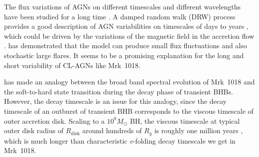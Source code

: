 \documentclass[twocolumn]{aastex63}
\begin{document}
The flux variations of AGNs on different timescales and different wavelengths have been studied for a long time \citep[see reviews in ][]{1997ARA&A..35..445U}. A damped random walk (DRW) process provides a good description of AGN variabilities on timescales of days to years \citep[e.g.][]{2010ApJ...721.1014M,2011ApJ...730...52K}, which could be driven by the variations of the magnetic field in the accretion flow \citep{2004MNRAS.348..111K,2006MNRAS.368..379M,2007A&A...466..793J}. \citet{2004MNRAS.348..111K} has demonstrated that the model can produce small flux fluctuations and also stochastic large flares. It seems to be a promising explanation for the long and short variability of CL-AGNs like Mrk~1018. 

\citet{2018MNRAS.480.3898N} has made an analogy between the broad band spectral evolution of Mrk~1018 and the soft-to-hard state transition during the decay phase of transient BHBs. However, the decay timescale is an issue for this analogy, since the decay timescale of an outburst of transient BHB corresponds to the viscous timescale of outer accretion disk. Scaling to a $10^{8}M_{\odot}$ BH, the viscous timescale at typical outer disk radius of $R_\mathrm{disk}$ around hundreds of $R_g$ is roughly one million years \citep{2012MmSAI..83..469L,2018MNRAS.475.1190Y}, which is much longer than characteristic \textit{e}-folding decay timescale we get in Mrk~1018.  
\end{document}
